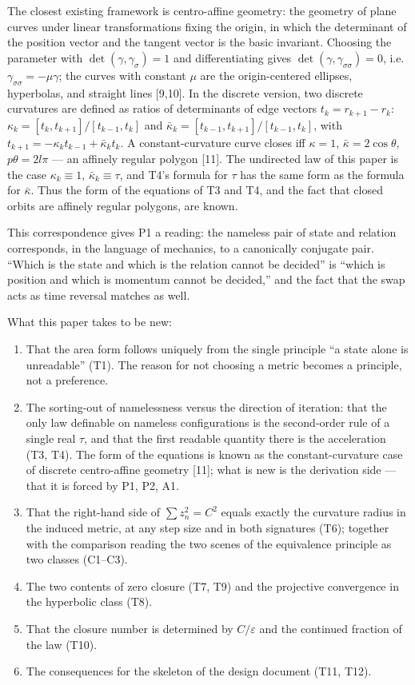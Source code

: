 \documentclass[
  a4paper,
]{article}
\providecommand{\tightlist}{%
  \setlength{\itemsep}{0pt}\setlength{\parskip}{0pt}}
\begin{document}
The closest existing framework is centro-affine geometry: the geometry
of plane curves under linear transformations fixing the origin, in which
the determinant of the position vector and the tangent vector is the
basic invariant. Choosing the parameter with
\(\det(\gamma,\gamma_\sigma)=1\) and differentiating gives
\(\det(\gamma,\gamma_{\sigma\sigma})=0\),
i.e.~\(\gamma_{\sigma\sigma}=-\mu\gamma\); the curves with constant
\(\mu\) are the origin-centered ellipses, hyperbolas, and straight lines
{[}9,10{]}. In the discrete version, two discrete curvatures are defined
as ratios of determinants of edge vectors \(t_k=r_{k+1}-r_k\):
\(\kappa_k=[t_k,t_{k+1}]/[t_{k-1},t_k]\) and
\(\bar\kappa_k=[t_{k-1},t_{k+1}]/[t_{k-1},t_k]\), with
\(t_{k+1}=-\kappa_kt_{k-1}+\bar\kappa_kt_k\). A constant-curvature curve
closes iff \(\kappa=1\), \(\bar\kappa=2\cos\theta\), \(p\theta=2l\pi\)
--- an affinely regular polygon {[}11{]}. The undirected law of this
paper is the case \(\kappa_k\equiv1\), \(\bar\kappa_k\equiv\tau\), and
T4's formula for \(\tau\) has the same form as the formula for
\(\bar\kappa\). Thus the form of the equations of T3 and T4, and the
fact that closed orbits are affinely regular polygons, are known.

This correspondence gives P1 a reading: the nameless pair of state and
relation corresponds, in the language of mechanics, to a canonically
conjugate pair. ``Which is the state and which is the relation cannot be
decided'' is ``which is position and which is momentum cannot be
decided,'' and the fact that the swap acts as time reversal matches as
well.

What this paper takes to be new:

\begin{enumerate}
\def\labelenumi{\arabic{enumi}.}
\tightlist
\item
  That the area form follows uniquely from the single principle ``a
  state alone is unreadable'' (T1). The reason for not choosing a metric
  becomes a principle, not a preference.
\item
  The sorting-out of namelessness versus the direction of iteration:
  that the only law definable on nameless configurations is the
  second-order rule of a single real \(\tau\), and that the first
  readable quantity there is the acceleration (T3, T4). The form of the
  equations is known as the constant-curvature case of discrete
  centro-affine geometry {[}11{]}; what is new is the derivation side
  --- that it is forced by P1, P2, A1.
\item
  That the right-hand side of \(\sum z_n^2=C^2\) equals exactly the
  curvature radius in the induced metric, at any step size and in both
  signatures (T6); together with the comparison reading the two scenes
  of the equivalence principle as two classes (C1--C3).
\item
  The two contents of zero closure (T7, T9) and the projective
  convergence in the hyperbolic class (T8).
\item
  That the closure number is determined by \(C/\varepsilon\) and the
  continued fraction of the law (T10).
\item
  The consequences for the skeleton of the design document (T11, T12).
\end{enumerate}
\end{document}
